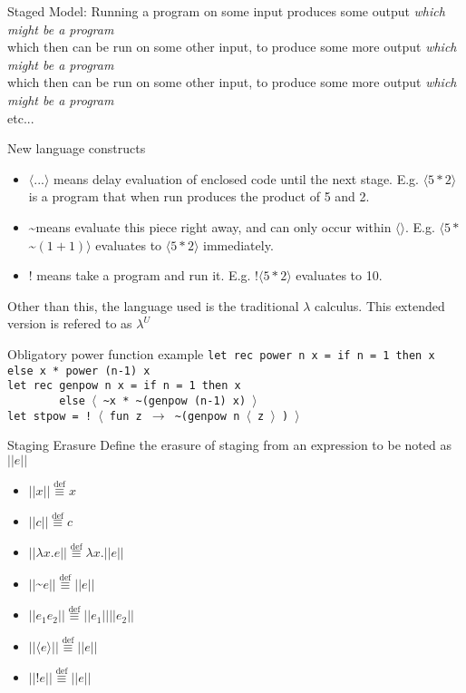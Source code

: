 \documentclass{beamer}
\newcommand{\defeq}{\overset{\text{def}}\equiv}
\begin{document}
\begin{frame}
Staged Model: Running a program on some input produces some output \textit{which might be a program}\\
which then can be run on some other input, to produce some more output \textit{which might be a program}\\
which then can be run on some other input, to produce some more output \textit{which might be a program}\\
etc...
\end{frame}

\begin{frame}{New language constructs}
\begin{itemize}
  \item $\langle ... \rangle$ means delay evaluation of enclosed code until the next stage. E.g. $\langle 5 * 2 \rangle$ is a program that when run produces the product of 5 and 2.
  \item \textasciitilde means evaluate this piece right away, and can only occur within $\langle \rangle$. E.g. $\langle 5 * $\textasciitilde $(1 + 1)\rangle$ evaluates to $\langle 5 * 2\rangle$ immediately.
  \item $!$ means take a program and run it. E.g. $!\langle 5 * 2 \rangle$ evaluates to 10.
\end{itemize}

Other than this, the language used is the traditional $\lambda$ calculus. This extended version is refered to as $\lambda ^U$
\end{frame}

\begin{frame}{Obligatory power function example}
\small
\texttt{let rec power n x = if n = 1 then x else x * power (n-1) x}\\
\texttt{let rec genpow n x = if n = 1 then x}\\
\texttt{\ \ \ \ \ \ \ \ else $\langle$ \textasciitilde x * \textasciitilde (genpow (n-1) x) $\rangle$}\\
\texttt{let stpow = ! $\langle$ fun z $\rightarrow$ \textasciitilde (genpow n $\langle$ z $\rangle$ ) $\rangle$}
\end{frame}

\begin{frame}{Staging Erasure}
Define the erasure of staging from an expression to be noted as $||e||$\\
\begin{itemize}
  \item $||x|| \defeq x$
  \item $||c|| \defeq c$
  \item $||\lambda x.e|| \defeq \lambda x.||e||$
  \item $||$\textasciitilde$e|| \defeq ||e||$
  \item $||e_1 e_2|| \defeq ||e_1|| ||e_2||$
  \item $||\langle e \rangle|| \defeq ||e||$
  \item $||!e|| \defeq ||e||$
\end{itemize}
\end{frame}
\end{document}
